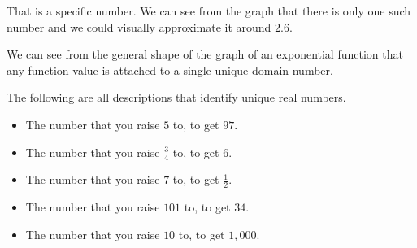 \documentclass{ximera}
\begin{document}
That is a specific number. We can see from the graph that there is only one such number and we could visually approximate it around $2.6$.




\begin{image}
\end{image}





We can see from the general shape of the graph of an exponential function that any function value is attached to a single unique domain number. 



\begin{example}

The following are all descriptions that identify unique real numbers.

\begin{itemize}
\item The number that you raise $5$ to, to get $97$.
\item The number that you raise $\frac{3}{4}$ to, to get $6$.
\item The number that you raise $7$ to, to get $\frac{1}{2}$.
\item The number that you raise $101$ to, to get $34$.
\item The number that you raise $10$ to, to get $1,000$.
\end{itemize}

\end{example}
\end{document}
